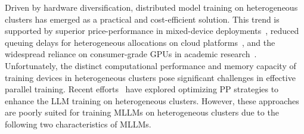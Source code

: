 \documentclass[conference]{IEEEtran}
\begin{document}
Driven by hardware diversification, distributed model training on heterogeneous clusters has emerged as a practical and cost-efficient solution.
This trend is supported by superior price-performance in mixed-device deployments~\cite{epoch2022trendsingpupriceperformance, jeon2019analysis}, reduced queuing delays for heterogeneous allocations on cloud platforms~\cite{weng2022mlaas}, and the widespread reliance on consumer-grade GPUs in academic research~\cite{song2024powerinfer}.
Unfortunately, the distinct computational performance and memory capacity of training devices in heterogeneous clusters pose significant challenges in effective parallel training.
Recent efforts~\cite{park2020hetpipe,jia2022whale,zhouespresso} have explored optimizing PP strategies to enhance the LLM training on heterogeneous clusters.
However, these approaches are poorly suited for training MLLMs on heterogeneous clusters due to the following two characteristics of MLLMs.
\end{document}
